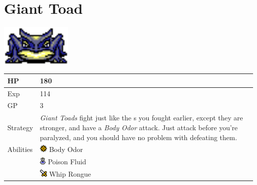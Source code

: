 \section{Giant Toad}
\label{monster:giant_toad}

\includegraphics[height=2cm,keepaspectratio]{./resources/monster/giant_toad}

\begin{longtable}{ l p{9cm} }
	HP
	& 180
\\ \hline
	Exp
	& 114
\\ \hline
	GP
	& 3
\\ \hline
	Strategy
	& \textit{Giant Toads} fight just like the \nameref{monster:poison_toad}s you fought earlier, except they are stronger, and have a \textit{Body Odor} attack. Just attack before you're paralyzed, and you should have no problem with defeating them.
\\ \hline
	Abilities
	& \includegraphics[height=1em,keepaspectratio]{./resources/effects/paralyze} Body Odor \\
	& \includegraphics[height=1em,keepaspectratio]{./resources/effects/poison} Poison Fluid \\
	& \includegraphics[height=1em,keepaspectratio]{./resources/effects/damage} Whip Rongue
\end{longtable}
